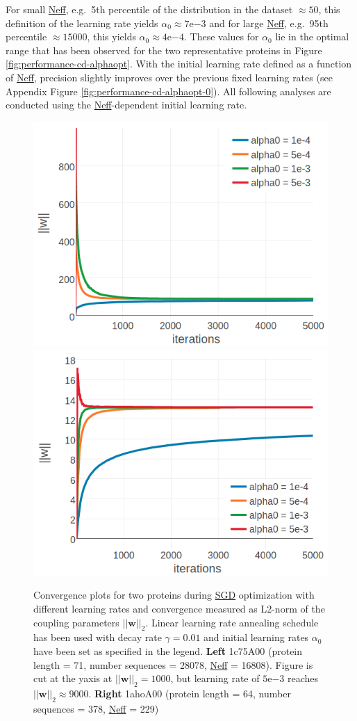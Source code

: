 \documentclass[11pt,a4paper,twoside]{book}
\newcommand{\w}{\mathbf{w}}
\theoremstyle{definition}
\theoremstyle{definition}
\theoremstyle{remark}
\begin{document}
For small \protect\hyperlink{abbrev}{Neff}, e.g.~5th percentile of the
distribution in the dataset \(\approx 50\), this definition of the
learning rate yields \(\alpha_0 \approx 7\mathrm{e}{-3}\) and for large
\protect\hyperlink{abbrev}{Neff}, e.g.~95th percentile
\(\approx 15000\), this yields \(\alpha_0 \approx 4\mathrm{e}{-4}\).
These values for \(\alpha_0\) lie in the optimal range that has been
observed for the two representative proteins in Figure
\ref{fig:performance-cd-alphaopt}. With the initial learning rate
defined as a function of \protect\hyperlink{bbrev}{Neff}, precision
slightly improves over the previous fixed learning rates (see Appendix
Figure \ref{fig:performance-cd-alphaopt-0}). All following analyses are
conducted using the \protect\hyperlink{abbrev}{Neff}-dependent initial
learning rate.














\begin{figure}

{\centering \includegraphics[width=0.48\linewidth]{img/full_likelihood/sgd/parameter_norm_1c75a00_alphas_lindecay001} \includegraphics[width=0.48\linewidth]{img/full_likelihood/sgd/parameter_norm_1ahoa00_alphas_lindecay001} 

}

\caption{Convergence
plots for two proteins during \protect\hyperlink{abbrev}{SGD}
optimization with different learning rates and convergence measured as
L2-norm of the coupling parameters \(||\w||_2\). Linear learning rate
annealing schedule has been used with decay rate \(\gamma=0.01\) and
initial learning rates \(\alpha_0\) have been set as specified in the
legend. \textbf{Left} 1c75A00 (protein length = 71, number sequences =
28078, \protect\hyperlink{abbrev}{Neff} = 16808). Figure is cut at the
yaxis at \(||\w||_2=1000\), but learning rate of \(5\mathrm{e}{-3}\)
reaches \(||\w||_2 \approx 9000\). \textbf{Right} 1ahoA00 (protein
length = 64, number sequences = 378, \protect\hyperlink{abbrev}{Neff} =
229)}\label{fig:sgd-single-proteins-initial-learning-rate}
\end{figure}
\end{document}
